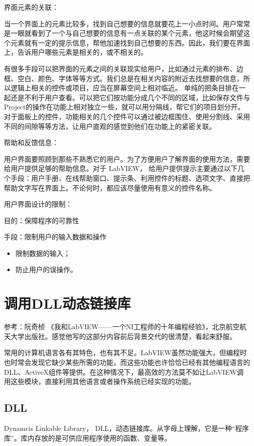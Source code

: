界面元素的关联：

当一个界面上的元素比较多，找到自己想要的信息就要花上一小点时间。用户常常是一眼就看到了一个与自己想要的信息有一点关联的某个元素，他这时候会期望这个元素就有一定的提示信息，帮他加速找到自己想要的东西。因此，我们要在界面上，告诉用户哪些元素是相关的，或不相关的。

有很多手段可以把界面的元素之间的关联现实给用户，比如通过元素的排布、边框、空白、颜色、字体等等方式。我们总是在相关内容的附近去找想要的信息，所以逻辑上相关的控件或项目，应当在屏幕空间上相对临近。
单纯的把条目排在一起还是不利于用户查看。可以把它们按功能分成几个不同的区域，比如保存文件与 Project的操作在功能上相对独立一些，就可以用分隔线，帮它们的项目划分开。对于面板上的控件，功能相关的几个控件可以通过被边框围住、使用分割线、采用不同的间隙等等方法，让用户直观的感觉到他们在功能上的紧密关联。

帮助和反馈信息：

用户界面要照顾到那些不熟悉它的用户。为了方便用户了解界面的使用方法，需要给用户提供足够的帮助信息。对于 LabVIEW， 给用户提供提示主要通过以下几个手段：用户手册、在线帮助窗口、提示条、利用控件的标题、选项文字、直接把帮助文字写在界面上。不论何时，都应该尽量使用有意义的控件名称。

用户界面设计的限制：

目的：保障程序的可靠性

手段：限制用户的输入数据和操作
\begin{itemize}
\item 限制数据的输入；
\item 防止用户的误操作。
\end{itemize}



\section{调用DLL动态链接库}
参考：阮奇桢 《我和LabVIEW——一个NI工程师的十年编程经验》，北京航空航天大学出版社。感觉他写的这部分内容前后背景交代的很清楚，看起来舒服。

常用的计算机语言各有其特色，也有其不足。LabVIEW虽然功能强大，但编程时也时常会发现它缺少某些所需的功能，而这些功能也许恰恰已经有其他编程语言的DLL、ActiveX组件等提供。在这种情况下，最高效的方法莫不如让LabVIEW调用这些模块，直接利用其他语言或者操作系统已经实现的功能。


\subsection{DLL}
Dynamcis Linkable Library， DLL，动态链接库。从字母上理解，它是一种“程序库”。库内存放的是可供应用程序使用的函数、变量等。

